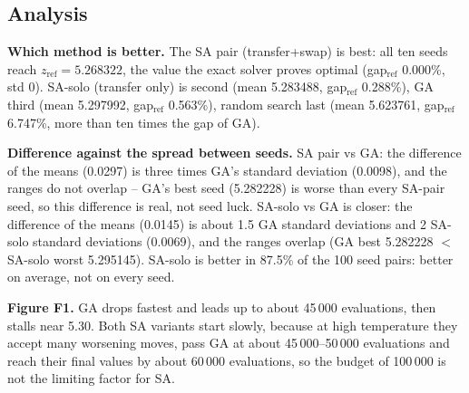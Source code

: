 \documentclass[11pt,a4paper]{article}
\newcommand{\zref}{z_{\mathrm{ref}}}
\begin{document}
\subsection*{Analysis}

\textbf{Which method is better.} The SA pair (transfer+swap) is best: all ten seeds reach $\zref=5.268322$, the value the exact solver proves optimal (gap$_{\mathrm{ref}}$ 0.000\%, std 0). SA-solo (transfer only) is second (mean 5.283488, gap$_{\mathrm{ref}}$ 0.288\%), GA third (mean 5.297992, gap$_{\mathrm{ref}}$ 0.563\%), random search last (mean 5.623761, gap$_{\mathrm{ref}}$ 6.747\%, more than ten times the gap of GA).

\textbf{Difference against the spread between seeds.} SA pair vs GA: the difference of the means (0.0297) is three times GA's standard deviation (0.0098), and the ranges do not overlap -- GA's best seed (5.282228) is worse than every SA-pair seed, so this difference is real, not seed luck. SA-solo vs GA is closer: the difference of the means (0.0145) is about 1.5 GA standard deviations and 2 SA-solo standard deviations (0.0069), and the ranges overlap (GA best 5.282228 $<$ SA-solo worst 5.295145). SA-solo is better in 87.5\% of the 100 seed pairs: better on average, not on every seed.

\textbf{Figure F1.} GA drops fastest and leads up to about 45\,000 evaluations, then stalls near 5.30. Both SA variants start slowly, because at high temperature they accept many worsening moves, pass GA at about 45\,000--50\,000 evaluations and reach their final values by about 60\,000 evaluations, so the budget of 100\,000 is not the limiting factor for SA.
\end{document}

